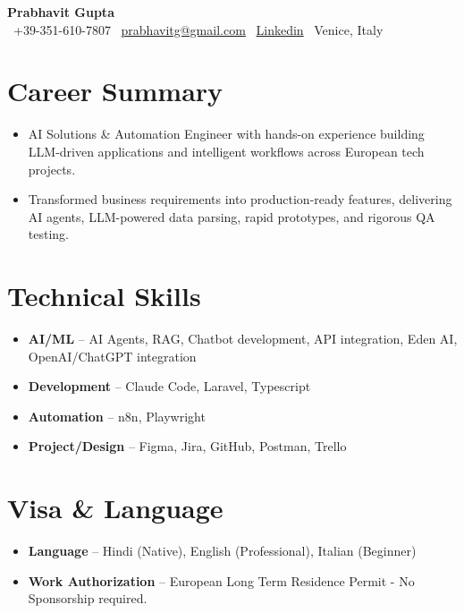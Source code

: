 \documentclass[a4paper,10pt]{article}
\begin{document}
\noindent
{\huge\bfseries Prabhavit Gupta}\\[8pt]
{\small \faPhone\ +39-351-610-7807 \quad \faEnvelope\ \href{mailto:prabhavitg@gmail.com}{prabhavitg@gmail.com} \quad \faLinkedin\ \href{https://www.linkedin.com/in/prabhavit/}{Linkedin} \quad \faMapMarker*\ Venice, Italy}

\section{Career Summary}
\begin{itemize}
\item AI Solutions \& Automation Engineer with hands-on experience building LLM-driven applications and intelligent workflows across European tech projects.
\item Transformed business requirements into production-ready features, delivering AI agents, LLM-powered data parsing, rapid prototypes, and rigorous QA testing.
\end{itemize}

\section{Technical Skills}
\begin{itemize}
\item \textbf{AI/ML} -- AI Agents, RAG, Chatbot development, API integration, Eden AI, OpenAI/ChatGPT integration
\item \textbf{Development} -- Claude Code, Laravel, Typescript
\item \textbf{Automation} -- n8n, Playwright
\item \textbf{Project/Design} -- Figma, Jira, GitHub, Postman, Trello
\end{itemize}

\section{Visa \& Language}
\begin{itemize}
\item \textbf{Language} -- Hindi (Native), English (Professional), Italian (Beginner)
\item \textbf{Work Authorization} -- European Long Term Residence Permit - No Sponsorship required.
\end{itemize}
\end{document}
